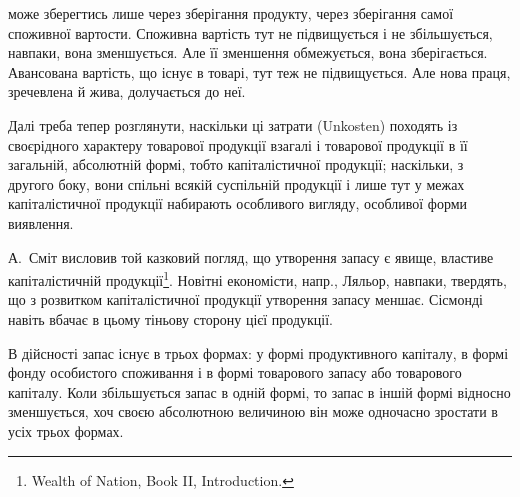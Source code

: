 \parcont{}  %
може зберегтись лише через зберігання продукту, через зберігання самої
споживної вартости. Споживна вартість тут не підвищується і не збільшується,
навпаки, вона зменшується. Але її зменшення обмежується,
вона зберігається. Авансована вартість, що існує в товарі, тут теж не
підвищується. Але нова праця, зречевлена й жива, долучається до неї.

Далі треба тепер розглянути, наскільки ці затрати (Unkosten)
походять із своєрідного характеру товарової продукції взагалі і товарової
продукції в її загальній, абсолютній формі, тобто капіталістичної продукції;
наскільки, з другого боку, вони спільні всякій суспільній продукції і
лише тут у межах капіталістичної продукції набирають особливого вигляду,
особливої форми виявлення.

А.~Сміт висловив той казковий погляд, що утворення запасу є явище,
властиве капіталістичній продукції\footnote{
Wealth of Nation, Book II, Introduction.
}. Новітні економісти, напр., Ляльор,
навпаки, твердять, що з розвитком капіталістичної продукції утворення запасу
меншає. Сісмонді навіть вбачає в цьому тіньову сторону цієї продукції.

В дійсності запас існує в трьох формах: у формі продуктивного
капіталу, в формі фонду особистого споживання і в формі товарового
запасу або товарового капіталу. Коли збільшується запас в одній формі,
то запас в іншій формі відносно зменшується, хоч своєю абсолютною
величиною він може одночасно зростати в усіх трьох формах.

